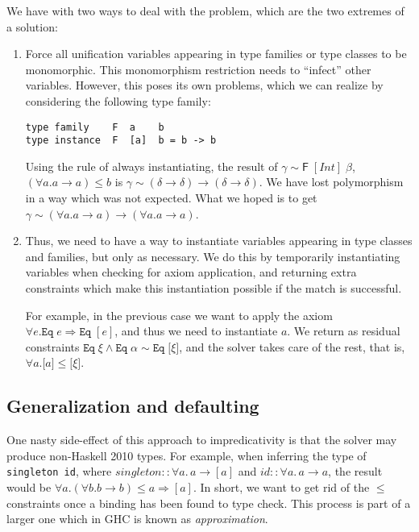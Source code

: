 \documentclass[12pt]{article}
\begin{document}
\noindent We have with two ways to deal with the problem, which are the two extremes of a solution:
\begin{enumerate}
\item Force all unification variables appearing in type families or type classes to be monomorphic. This monomorphism restriction needs to ``infect'' other variables. However, this poses its own problems, which we can realize by considering the following type family:
\begin{verbatim}
type family    F  a    b
type instance  F  [a]  b = b -> b
\end{verbatim}
Using the rule of always instantiating, the result of $\gamma \sim \mathsf{F} \; [Int] \; \beta$, $(\forall a. a \to a) \leq b$ is $\gamma \sim (\delta \to \delta) \to (\delta \to \delta)$. We have lost polymorphism in a way which was not expected. What we hoped is to get $\gamma \sim (\forall a. a \to a) \to (\forall a. a \to a)$.
\item Thus, we need to have a way to instantiate variables appearing in type classes and families, but only as necessary. We do this by temporarily instantiating variables when checking for axiom application, and returning extra constraints which make this instantiation possible if the match is successful.

For example, in the previous case we want to apply the axiom $\forall e. \mathtt{Eq} \; e \Rightarrow \mathtt{Eq} \; [e]$, and thus we need to instantiate $a$. We return as residual constraints $\mathtt{Eq} \; \xi \wedge \mathtt{Eq} \; \alpha \sim \mathtt{Eq} \; \mathrm{[}\xi\mathrm{]}$, and the solver takes care of the rest, that is, $\forall a. \mathrm{[}a\mathrm{]} \leq \mathrm{[}\xi\mathrm{]}$.
\end{enumerate}

\subsection{Generalization and defaulting}

One nasty side-effect of this approach to impredicativity is that the solver may produce non-Haskell 2010 types. For example, when inferring the type of {\tt singleton id}, where $singleton :: \forall a. \, a \to [a]$ and $id :: \forall a. \, a \to a$, the result would be $\forall a. (\forall b. b \to b) \leq a \Rightarrow [a]$. In short, we want to get rid of the $\leq$ constraints once a binding has been found to type check. This process is part of a larger one which in GHC is known as \emph{approximation}.
\end{document}
